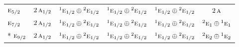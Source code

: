 \documentclass[10pt,a4paper]{article}
\numberwithin{equation}{section}
\newcommand{\irr}[1]{\text{\normalfont\scshape #1}}
\newcommand{\conjpair}[1]{{}^{#1}}
\begin{document}
{\begin{longtable}{@{}lccccc@{}}
$\irr{e}_{5/2}$ & $2\,\irr{a}_{1/2}$ & $\conjpair{1}\irr{e}_{1/2}\oplus \conjpair{2}\irr{e}_{1/2}$ & $\conjpair{1}\irr{e}_{1/2}\oplus \conjpair{2}\irr{e}_{1/2}$ & $\conjpair{1}\irr{e}_{1/2}\oplus \conjpair{2}\irr{e}_{1/2}$ & $2\,\irr{a}$\\
$\irr{e}_{7/2}$ & $2\,\irr{a}_{1/2}$ & $\conjpair{1}\irr{e}_{1/2}\oplus \conjpair{2}\irr{e}_{1/2}$ & $\conjpair{1}\irr{e}_{1/2}\oplus \conjpair{2}\irr{e}_{1/2}$ & $\conjpair{1}\irr{e}_{1/2}\oplus \conjpair{2}\irr{e}_{1/2}$ & $\conjpair{2}\irr{e}_{1}\oplus \conjpair{1}\irr{e}_{1}$\\*
$\irr{e}_{9/2}$ & $2\,\irr{a}_{1/2}$ & $\conjpair{1}\irr{e}_{1/2}\oplus \conjpair{2}\irr{e}_{1/2}$ & $\conjpair{1}\irr{e}_{1/2}\oplus \conjpair{2}\irr{e}_{1/2}$ & $\conjpair{1}\irr{e}_{1/2}\oplus \conjpair{2}\irr{e}_{1/2}$ & $\conjpair{2}\irr{e}_{2}\oplus \conjpair{1}\irr{e}_{2}$\\
\bottomrule\end{longtable}}
\end{document}
